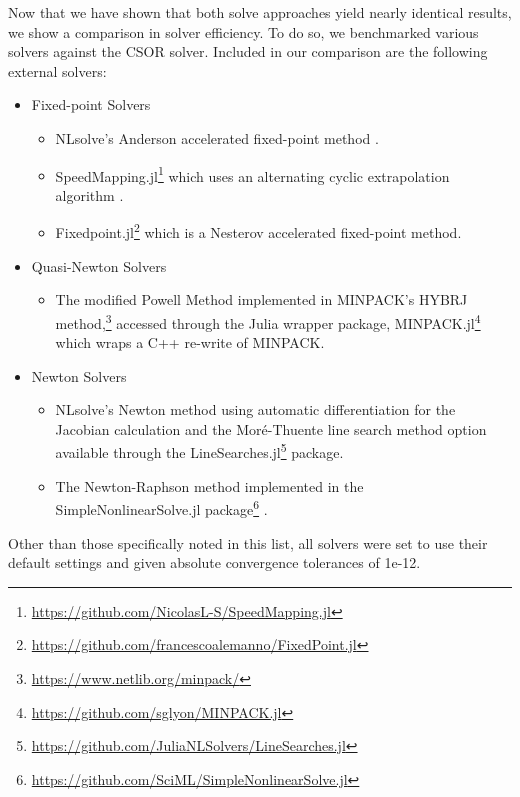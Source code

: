 Now that we have shown that both solve approaches yield nearly identical results, we show a comparison in solver efficiency.
%
To do so, we benchmarked various solvers against the CSOR solver.
%
Included in our comparison are the following external solvers:
%
\begin{itemize}
    \item Fixed-point Solvers
        \begin{itemize}
        \item NLsolve's  Anderson accelerated fixed-point method .
        \item SpeedMapping.jl\footnote{\url{https://github.com/NicolasL-S/SpeedMapping.jl}} which uses an alternating cyclic extrapolation algorithm .
        \item Fixedpoint.jl\footnote{\url{https://github.com/francescoalemanno/FixedPoint.jl}} which is a Nesterov accelerated fixed-point method.
        \end{itemize}
    \item Quasi-Newton Solvers
        \begin{itemize}
            \item The modified Powell Method  implemented in MINPACK's HYBRJ method,\footnote{\url{https://www.netlib.org/minpack/}} accessed through the Julia wrapper package, MINPACK.jl\footnote{\url{https://github.com/sglyon/MINPACK.jl}} which wraps a C++ re-write of MINPACK.
        \end{itemize}
    \item Newton Solvers
        \begin{itemize}
        \item NLsolve's Newton method using automatic differentiation for the Jacobian calculation and the Mor\'{e}-Thuente line search method  option available through the LineSearches.jl\footnote{\url{https://github.com/JuliaNLSolvers/LineSearches.jl}} package.
        \item The Newton-Raphson method implemented in the SimpleNonlinearSolve.jl package\footnote{\url{https://github.com/SciML/SimpleNonlinearSolve.jl}} .
    \end{itemize}
\end{itemize}
%
\noindent Other than those specifically noted in this list, all solvers were set to use their default settings and given absolute convergence tolerances of 1e-12.


